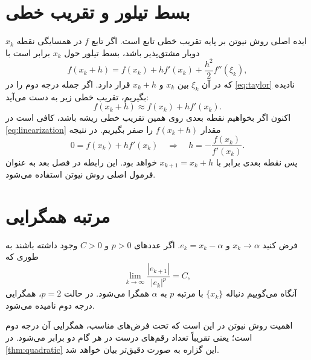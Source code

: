 \section{بسط تیلور و تقریب خطی}
ایده اصلی روش نیوتن بر پایه تقریب خطی تابع است. اگر تابع $f$ در همسایگی نقطه $x_k$ دوبار مشتق‌پذیر باشد، بسط تیلور حول $x_k$ برابر است با
\begin{equation}
 f(x_k+h)=f(x_k)+h f'(x_k)+\frac{h^2}{2}f''(\xi_k),
 \label{eq:taylor}
\end{equation}
که در آن $\xi_k$ بین $x_k$ و $x_k+h$ قرار دارد. اگر جمله درجه دوم را در \cref{eq:taylor} نادیده بگیریم، تقریب خطی زیر به دست می‌آید:
\begin{equation}
 f(x_k+h)\approx f(x_k)+h f'(x_k).
 \label{eq:linearization}
\end{equation}
اکنون اگر بخواهیم نقطه بعدی روی همین تقریب خطی ریشه باشد، کافی است در \cref{eq:linearization} مقدار $f(x_k+h)$ را صفر بگیریم. در نتیجه
\begin{equation}
 0=f(x_k)+h f'(x_k)
 \quad \Longrightarrow \quad
 h=-\frac{f(x_k)}{f'(x_k)}.
 \label{eq:h-formula}
\end{equation}
پس نقطه بعدی برابر با $x_{k+1}=x_k+h$ خواهد بود. این رابطه در فصل بعد به عنوان فرمول اصلی روش نیوتن استفاده می‌شود.

\section{مرتبه همگرایی}
\begin{definition}
فرض کنید $x_k\to \alpha$ و $e_k=x_k-\alpha$. اگر عددهای $p>0$ و $C>0$ وجود داشته باشند به طوری که
\begin{equation}
 \lim_{k\to\infty}\frac{|e_{k+1}|}{|e_k|^p}=C,
 \label{eq:order-conv}
\end{equation}
آنگاه می‌گوییم دنباله $\{x_k\}$ با مرتبه $p$ به $\alpha$ همگرا می‌شود. در حالت $p=2$، همگرایی درجه دوم نامیده می‌شود.
\end{definition}

اهمیت روش نیوتن در این است که تحت فرض‌های مناسب، همگرایی آن درجه دوم است؛ یعنی تقریباً تعداد رقم‌های درست در هر گام دو برابر می‌شود. در \cref{thm:quadratic} این گزاره به صورت دقیق‌تر بیان خواهد شد.
